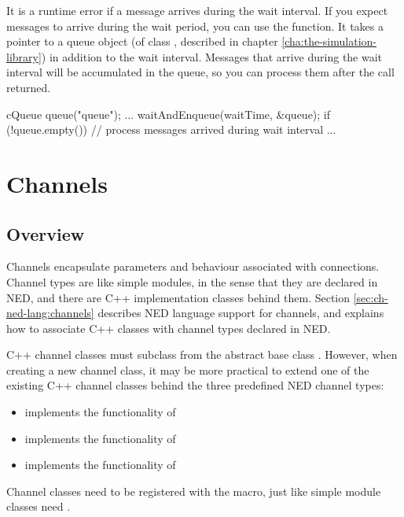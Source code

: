 It is a runtime error if a message arrives during the wait interval.
If you expect messages to arrive during the wait period, you can
use the  function. It takes a pointer to a queue object
(of class , described in chapter \ref{cha:the-simulation-library})
in addition to the wait interval. Messages that arrive during the
wait interval will be accumulated in the queue, so you can
process them after the  call returned.

\begin{cpp}
cQueue queue("queue");
...
waitAndEnqueue(waitTime, &queue);
if (!queue.empty())
{
    // process messages arrived during wait interval
    ...
}
\end{cpp}


\section{Channels}
\label{sec:simple-modules:channels}

\subsection{Overview}

Channels encapsulate parameters and behaviour associated with connections.
Channel types are like simple modules, in the sense that they are declared
in NED, and there are C++ implementation classes behind them. Section
\ref{sec:ch-ned-lang:channels} describes NED language support for channels,
and explains how to associate C++ classes with channel types declared in
NED.

C++ channel classes must subclass from the abstract base class
. However, when creating a new channel class, it may be
more practical to extend one of the existing C++ channel classes behind the
three predefined NED channel types:

\begin{itemize}
  \item {} implements the functionality of 
  \item {} implements the functionality of 
  \item {} implements the functionality of 
\end{itemize}

Channel classes need to be registered with the  macro,
just like simple module classes need .


